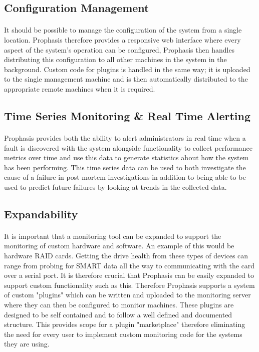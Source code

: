 \documentclass[bsc,logo,twoside]{infthesis}
\begin{document}
\subsection{Configuration Management}
\paragraph*{}
	It should be possible to manage the configuration of the system from a single
	location.  Prophasis therefore provides a responsive web interface where every
	aspect of the system's operation can be configured, Prophasis then handles
	distributing this configuration to all other machines in the system in the
	background. Custom code for plugins is handled in the same way; it is uploaded
	to the single management machine and is then automatically distributed to the
	appropriate remote machines when it is required.

\subsection{Time Series Monitoring \& Real Time Alerting}
\paragraph*{}
	Prophasis provides both the ability to alert administrators in real time when a
	fault is discovered with the system alongside functionality to collect
	performance metrics over time and use this data to generate statistics about
	how the system has been performing.  This time series data can be used to both
	investigate the cause of a failure in post-mortem investigations in addition to
	being able to be used to predict future failures by looking at trends in the
	collected data.

\subsection{Expandability}
\paragraph*{}
	It is important that a monitoring tool can be expanded to support the
	monitoring of custom hardware and software.  An example of this would be
	hardware RAID cards.  Getting the drive health from these types of devices can
	range from probing for SMART data all the way to communicating with the card
	over a serial port.  It is therefore crucial that Prophasis can be easily
	expanded to support custom functionality such as this. Therefore Prophasis
	supports a system of custom "plugins" which can be written and uploaded to the
	monitoring server where they can then be configured to monitor machines. These
	plugins are designed to be self contained and to follow a well defined and
	documented structure.  This provides scope for a plugin "marketplace" therefore
	eliminating the need for every user to implement custom monitoring code for the
	systems they are using.
\end{document}
